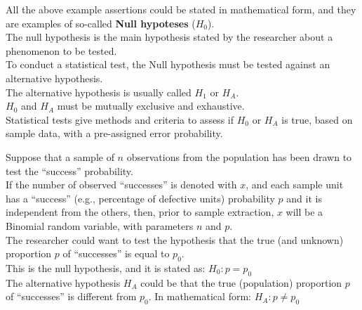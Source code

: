 \begin{frame}
  \vspace*{.3cm}
  All the above example assertions could be stated in mathematical form, and they are examples of so-called \textbf{Null hypoteses} (\boldmath$H_0$).\\
  \vspace*{.3cm}
  The null hypothesis is the main hypothesis stated by the researcher about a phenomenon to be tested.\\
  \vspace*{.3cm}
  To conduct a statistical test, the Null hypothesis must be tested against an alternative hypothesis.\\
  \vspace*{.3cm}
  The alternative hypothesis is usually called $H_1$ or $H_A$. \\
  \vspace*{.3cm}
  $H_0$ and $H_A$ must be mutually exclusive and exhaustive.\\
  \vspace*{.3cm}
  Statistical tests give methods and criteria to assess if $H_0$ or $H_A$ is true, based on sample data, with a pre-assigned error probability.\\
\end{frame}


\begin{frame}
  Suppose that a sample of $n$ observations from the population has been drawn to test the ``success'' probability.\\
  \vspace*{.3cm}
  If the number of observed ``successes'' is denoted with $x$, and each sample unit has a ``success'' (e.g., percentage of defective units) probability $p$ and it is independent from the others, then, prior to sample extraction, $x$ will be a Binomial random variable, with parameters $n$ and $p$. \\
  \vspace*{.3cm}
  The researcher could want to test the hypothesis that the true (and unknown) proportion $p$ of ``successes'' is equal to $ p_0 $. \\
  This is the null hypothesis, and it is stated as:
  \boldmath$H_0: p=p_0$\\
  \vspace*{.5cm}
  The alternative hypothesis $H_A$ could be that the true (population) proportion $p$ of ``successes'' is different from $p_0$. In mathematical form:
  \boldmath$H_A: p\neq p_0$
\end{frame}

